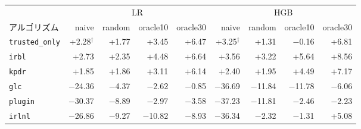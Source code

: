 \begin{tabular}{lrrrrrrrr}
\toprule
 & \multicolumn{4}{c}{LR} & \multicolumn{4}{c}{HGB} \\
\cmidrule(lr){2-5} \cmidrule(lr){6-9}
アルゴリズム & naive & random & oracle10 & oracle30 & naive & random & oracle10 & oracle30 \\
\midrule
\texttt{trusted\_only} & +2.28$^\dagger$ & +1.77 & +3.45 & +6.47 & +3.25$^\dagger$ & +1.31 & $-$0.16 & +6.81 \\
\texttt{irbl} & +2.73 & +2.35 & +4.48 & +6.64 & +3.56 & +3.22 & +5.64 & +8.56 \\
\texttt{kpdr} & +1.85 & +1.86 & +3.11 & +6.14 & +2.40 & +1.95 & +4.49 & +7.17 \\
\texttt{glc} & $-$24.36 & $-$4.37 & $-$2.62 & $-$0.85 & $-$36.69 & $-$11.84 & $-$11.78 & $-$6.06 \\
\texttt{plugin} & $-$30.37 & $-$8.89 & $-$2.97 & $-$3.58 & $-$37.23 & $-$11.81 & $-$2.46 & $-$2.23 \\
\texttt{irlnl} & $-$26.86 & $-$9.27 & $-$10.82 & $-$8.93 & $-$36.34 & $-$2.32 & $-$1.31 & +5.08 \\
\bottomrule
\end{tabular}
